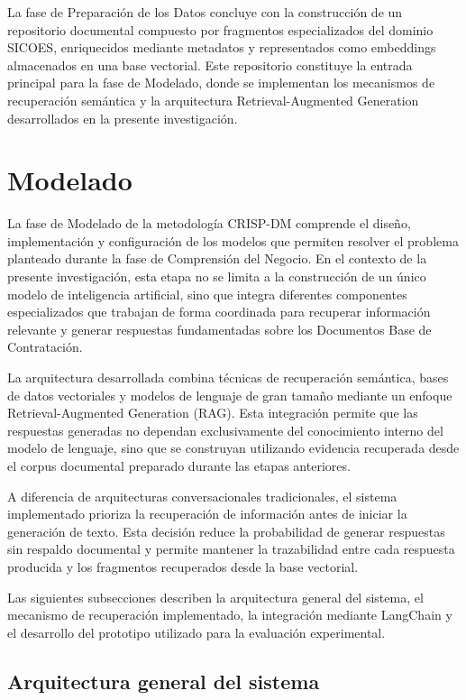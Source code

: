 La fase de Preparación de los Datos concluye con la construcción de un repositorio documental compuesto por fragmentos especializados del dominio SICOES, enriquecidos mediante metadatos y representados como embeddings almacenados en una base vectorial. Este repositorio constituye la entrada principal para la fase de Modelado, donde se implementan los mecanismos de recuperación semántica y la arquitectura Retrieval-Augmented Generation desarrollados en la presente investigación.


\section{Modelado}

La fase de Modelado de la metodología CRISP-DM comprende el diseño, implementación y configuración de los modelos que permiten resolver el problema planteado durante la fase de Comprensión del Negocio. En el contexto de la presente investigación, esta etapa no se limita a la construcción de un único modelo de inteligencia artificial, sino que integra diferentes componentes especializados que trabajan de forma coordinada para recuperar información relevante y generar respuestas fundamentadas sobre los Documentos Base de Contratación.

La arquitectura desarrollada combina técnicas de recuperación semántica, bases de datos vectoriales y modelos de lenguaje de gran tamaño mediante un enfoque Retrieval-Augmented Generation (RAG). Esta integración permite que las respuestas generadas no dependan exclusivamente del conocimiento interno del modelo de lenguaje, sino que se construyan utilizando evidencia recuperada desde el corpus documental preparado durante las etapas anteriores.

A diferencia de arquitecturas conversacionales tradicionales, el sistema implementado prioriza la recuperación de información antes de iniciar la generación de texto. Esta decisión reduce la probabilidad de generar respuestas sin respaldo documental y permite mantener la trazabilidad entre cada respuesta producida y los fragmentos recuperados desde la base vectorial.

Las siguientes subsecciones describen la arquitectura general del sistema, el mecanismo de recuperación implementado, la integración mediante LangChain y el desarrollo del prototipo utilizado para la evaluación experimental.

\subsection{Arquitectura general del sistema}

